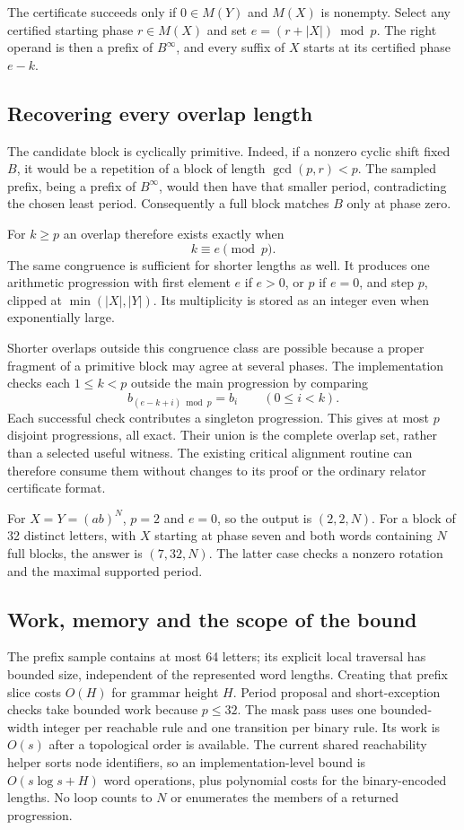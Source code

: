 The certificate succeeds only if $0\in M(Y)$ and $M(X)$ is nonempty.
Select any certified starting phase $r\in M(X)$ and set
$e=(r+|X|)\bmod p$. The right operand is then a prefix of $B^\infty$,
and every suffix of $X$ starts at its certified phase $e-k$.

\subsection{Recovering every overlap length}

The candidate block is cyclically primitive. Indeed, if a nonzero cyclic
shift fixed $B$, it would be a repetition of a block of length
$\gcd(p,r)<p$. The sampled prefix, being a prefix of $B^\infty$, would
then have that smaller period, contradicting the chosen least period.
Consequently a full block matches $B$ only at phase zero.

For $k\ge p$ an overlap therefore exists exactly when
\[
 k\equiv e\pmod p.
\]
The same congruence is sufficient for shorter lengths as well. It produces
one arithmetic progression with first element $e$ if $e>0$, or $p$ if
$e=0$, and step $p$, clipped at $\min(|X|,|Y|)$. Its multiplicity is stored
as an integer even when exponentially large.

Shorter overlaps outside this congruence class are possible because a
proper fragment of a primitive block may agree at several phases.
The implementation checks each $1\le k<p$ outside the main progression
by comparing
\[
 b_{(e-k+i)\bmod p}=b_i\qquad(0\le i<k).
\]
Each successful check contributes a singleton progression. This gives at
most $p$ disjoint progressions, all exact. Their union is the complete
overlap set, rather than a selected useful witness. The existing critical
alignment routine can therefore consume them without changes to its proof
or the ordinary relator certificate format.

For $X=Y=(ab)^N$, $p=2$ and $e=0$, so the output is $(2,2,N)$.
For a block of 32 distinct letters, with $X$ starting at phase seven and
both words containing $N$ full blocks, the answer is $(7,32,N)$. The latter
case checks a nonzero rotation and the maximal supported period.

\subsection{Work, memory and the scope of the bound}

The prefix sample contains at most 64 letters; its explicit local traversal
has bounded size, independent of the represented word lengths. Creating
that prefix slice costs $O(H)$ for grammar height $H$. Period proposal
and short-exception checks take bounded work because $p\le32$.
The mask pass uses one bounded-width integer per reachable rule and one
transition per binary rule. Its work is $O(s)$ after a topological order
is available. The current shared reachability helper sorts node identifiers,
so an implementation-level bound is $O(s\log s+H)$ word operations,
plus polynomial costs for the binary-encoded lengths. No loop counts to
$N$ or enumerates the members of a returned progression.

